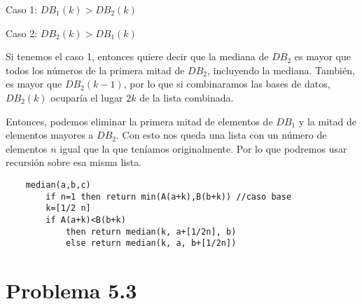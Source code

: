 \documentclass{article}
\begin{document}
Caso 1: $DB_1(k) > DB_2(k)$

Caso 2: $DB_2(k) > DB_1(k)$

Si tenemos el caso 1, entonces quiere decir que la mediana de $DB_2$ es mayor
que todos los números de la primera mitad de $DB_2$, incluyendo la mediana.
También, es mayor que $DB_2(k-1)$, por lo que si combinaramos las bases de
datos, $DB_2(k)$ ocuparía el lugar $2k$ de la lista combinada.

Entonces, podemos eliminar la primera mitad de elementos de $DB_1$ y la mitad de
elementos mayores a $DB_2$. Con esto nos queda una lista con un número de
elementos $n$ igual que la que teníamos originalmente. Por lo que podremos usar
recursión sobre esa misma lista.

\pagebreak

\begin{verbatim}
    median(a,b,c)
        if n=1 then return min(A(a+k),B(b+k)) //caso base
        k=[1/2 n]
        if A(a+k)<B(b+k)
            then return median(k, a+[1/2n], b)
            else return median(k, a, b+[1/2n])
\end{verbatim}

\section*{Problema 5.3}

\end{document}
